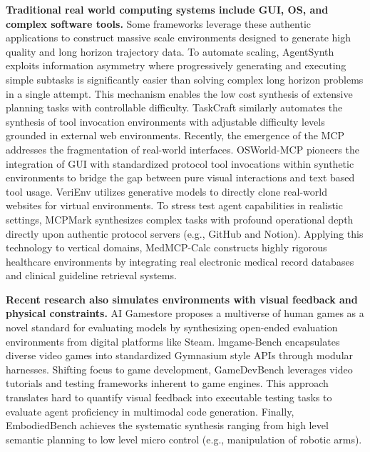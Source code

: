 \textbf{Traditional real world computing systems include GUI, OS, and complex software tools.} Some frameworks leverage these authentic applications to construct massive scale environments \cite{Agent2World, SWE-Universe} designed to generate high quality and long horizon trajectory data. To automate scaling, AgentSynth \cite{AgentSynth} exploits information asymmetry where progressively generating and executing simple subtasks is significantly easier than solving complex long horizon problems in a single attempt. This mechanism enables the low cost synthesis of extensive planning tasks with controllable difficulty. TaskCraft \cite{TaskCraft} similarly automates the synthesis of tool invocation environments with adjustable difficulty levels grounded in external web environments. Recently, the emergence of the MCP addresses the fragmentation of real-world interfaces. OSWorld-MCP \cite{OSWorld-MCP} pioneers the integration of GUI with standardized protocol tool invocations within synthetic environments to bridge the gap between pure visual interactions and text based tool usage. VeriEnv \cite{VeriEnv} utilizes generative models to directly clone real-world websites for virtual environments. To stress test agent capabilities in realistic settings, MCPMark \cite{MCPMark} synthesizes complex tasks with profound operational depth directly upon authentic protocol servers (e.g., GitHub and Notion). Applying this technology to vertical domains, MedMCP-Calc \cite{MedMCP-Calc} constructs highly rigorous healthcare environments by integrating real electronic medical record databases and clinical guideline retrieval systems. 

\textbf{Recent research also simulates environments with visual feedback and physical constraints.} AI Gamestore \cite{AI_GAMESTORE} proposes a multiverse of human games as a novel standard for evaluating models by synthesizing open-ended evaluation environments from digital platforms like Steam. lmgame-Bench \cite{LMGAME-BENCH} encapsulates diverse video games into standardized Gymnasium style APIs through modular harnesses. Shifting focus to game development, GameDevBench \cite{GameDevBench} leverages video tutorials and testing frameworks inherent to game engines. This approach translates hard to quantify visual feedback into executable testing tasks to evaluate agent proficiency in multimodal code generation. Finally, EmbodiedBench \cite{EmbodiedBench} achieves the systematic synthesis ranging from high level semantic planning to low level micro control (e.g., manipulation of robotic arms). 

